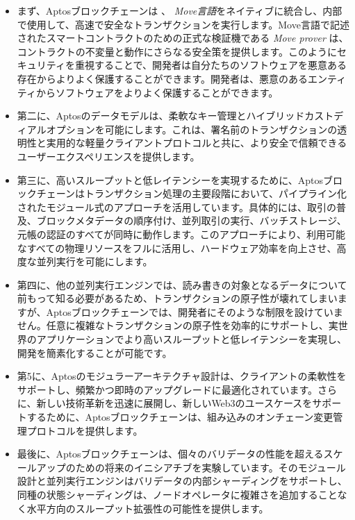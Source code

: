 \documentclass{article}
\begin{document}
 \begin{itemize}
  \item まず、Aptosブロックチェーンは 、 \emph{Move言語}をネイティブに統合し、内部で使用して、高速で安全なトランザクションを実行します\cite{move_github}。Move言語で記述されたスマートコントラクトのための正式な検証機である \emph{Move prover} は、コントラクトの不変量と動作にさらなる安全策を提供します。このようにセキュリティを重視することで、開発者は自分たちのソフトウェアを悪意ある存在からよりよく保護することができます。開発者は、悪意のあるエンティティからソフトウェアをよりよく保護することができます。
  
  \item 第二に、Aptosのデータモデルは、柔軟なキー管理とハイブリッドカストディアルオプションを可能にします。これは、署名前のトランザクションの透明性と実用的な軽量クライアントプロトコルと共に、より安全で信頼できるユーザーエクスペリエンスを提供します。
  
  \item 第三に、高いスループットと低レイテンシーを実現するために、Aptosブロックチェーンはトランザクション処理の主要段階において、パイプライン化されたモジュール式のアプローチを活用しています。具体的には、取引の普及、ブロックメタデータの順序付け、並列取引の実行、バッチストレージ、元帳の認証のすべてが同時に動作します。このアプローチにより、利用可能なすべての物理リソースをフルに活用し、ハードウェア効率を向上させ、高度な並列実行を可能にします。
  
  \item 第四に、他の並列実行エンジンでは、読み書きの対象となるデータについて前もって知る必要があるため、トランザクションの原子性が壊れてしまいますが、Aptosブロックチェーンでは、開発者にそのような制限を設けていません。任意に複雑なトランザクションの原子性を効率的にサポートし、実世界のアプリケーションでより高いスループットと低レイテンシーを実現し、開発を簡素化することが可能です。
  
 \item 第5に、Aptosのモジュラーアーキテクチャ設計は、クライアントの柔軟性をサポートし、頻繁かつ即時のアップグレードに最適化されています。さらに、新しい技術革新を迅速に展開し、新しいWeb3のユースケースをサポートするために、Aptosブロックチェーンは、組み込みのオンチェーン変更管理プロトコルを提供します。
 
 \item 最後に、Aptosブロックチェーンは、個々のバリデータの性能を超えるスケールアップのための将来のイニシアチブを実験しています。そのモジュール設計と並列実行エンジンはバリデータの内部シャーディングをサポートし、同種の状態シャーディングは、ノードオペレータに複雑さを追加することなく水平方向のスループット拡張性の可能性を提供します。
\end{itemize}
\end{document}
